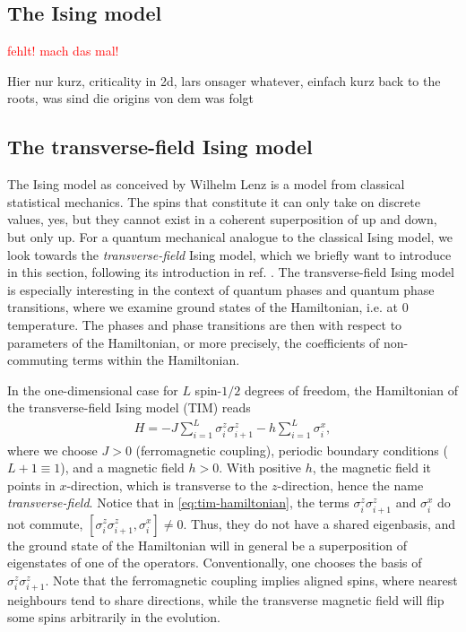 \subsection{The Ising model}

\textcolor{red}{fehlt! mach das mal!}

Hier nur kurz, criticality in 2d, lars onsager whatever, einfach kurz back to
the roots, was sind die origins von dem was folgt
\subsection{The transverse-field Ising model}

The Ising model as conceived by Wilhelm Lenz is a model from classical
statistical mechanics. The spins that constitute it can only take on discrete
values, yes, but they cannot exist in a coherent superposition of up and down,
but only up. For a quantum mechanical analogue to the classical Ising model, we
look towards the \emph{transverse-field} Ising model, which we briefly want to
introduce in this section, following its introduction in ref.
\cite{langLectureNotesTopological2021}.  The transverse-field Ising model is
especially interesting in the context of quantum phases and quantum phase
transitions, where we examine ground states of the Hamiltonian, i.e. at $0$
temperature. The phases and phase transitions are then with respect to
parameters of the Hamiltonian, or more precisely, the coefficients of
non-commuting terms within the Hamiltonian.

In the one-dimensional
case for $L$ spin-$1 /2$ degrees of freedom, the Hamiltonian of the
transverse-field Ising model (TIM) reads
\begin{align}\label{eq:tim-hamiltonian}
  H = -J\sum_{i=1}^L \sigma_i^z \sigma_{i+1}^z - h\sum_{i=1}^L \sigma_i^x
,\end{align}
where we choose $J>0$ (ferromagnetic coupling), periodic boundary conditions
($L+1 \equiv 1$), and a magnetic field $h>0$. With
positive $h$, the magnetic field it points in $x$-direction, which is transverse to the
$z$-direction, hence the name \emph{transverse-field}. 
Notice that in \cref{eq:tim-hamiltonian}, the terms $\sigma_i^z\sigma_{i+1}^z$
and $\sigma_i^x$ do not commute, $[\sigma_i^z\sigma_{i+1}^z,\sigma_i^x]\neq 0$.
Thus, they do not have a shared eigenbasis, and the ground state of the
Hamiltonian will in general be a superposition of eigenstates of one of the
operators. Conventionally, one chooses the basis of $\sigma_i^z\sigma_{i+1}^z$.
Note that the ferromagnetic coupling implies aligned spins, where nearest
neighbours tend to share directions, while the transverse magnetic field will
flip some spins arbitrarily in the evolution.

